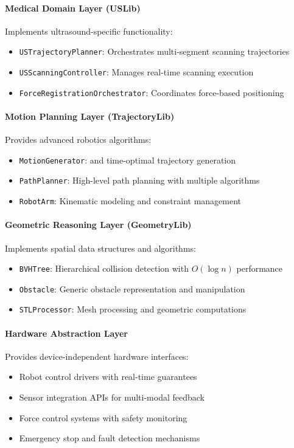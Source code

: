 \paragraph{Medical Domain Layer (USLib)}
Implements ultrasound-specific functionality:
\begin{itemize}
    \item \texttt{USTrajectoryPlanner}: Orchestrates multi-segment scanning trajectories
    \item \texttt{USScanningController}: Manages real-time scanning execution
    \item \texttt{ForceRegistrationOrchestrator}: Coordinates force-based positioning
\end{itemize}

\paragraph{Motion Planning Layer (TrajectoryLib)}
Provides advanced robotics algorithms:
\begin{itemize}
    \item \texttt{MotionGenerator}: \stomp{} and time-optimal trajectory generation
    \item \texttt{PathPlanner}: High-level path planning with multiple algorithms
    \item \texttt{RobotArm}: Kinematic modeling and constraint management
\end{itemize}

\paragraph{Geometric Reasoning Layer (GeometryLib)}
Implements spatial data structures and algorithms:
\begin{itemize}
    \item \texttt{BVHTree}: Hierarchical collision detection with $O(\log n)$ performance
    \item \texttt{Obstacle}: Generic obstacle representation and manipulation
    \item \texttt{STLProcessor}: Mesh processing and geometric computations
\end{itemize}

\paragraph{Hardware Abstraction Layer}
Provides device-independent hardware interfaces:
\begin{itemize}
    \item Robot control drivers with real-time guarantees
    \item Sensor integration APIs for multi-modal feedback
    \item Force control systems with safety monitoring
    \item Emergency stop and fault detection mechanisms
\end{itemize}

